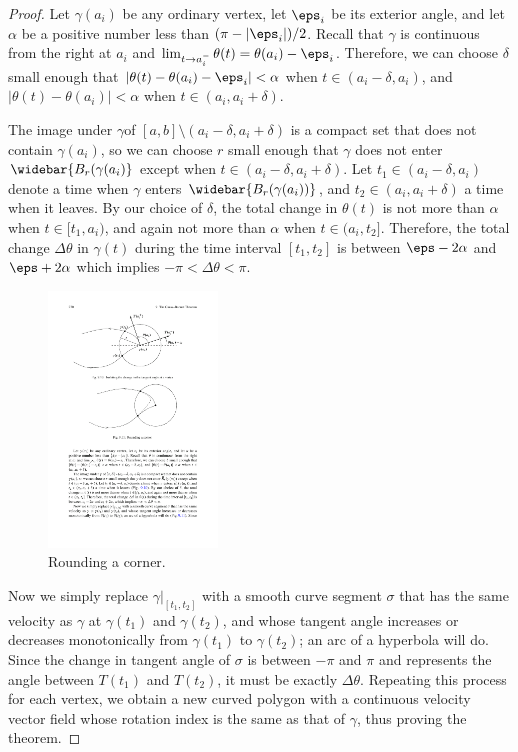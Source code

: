 \begin{proof}
Let $\gamma(a_i)$ be any ordinary vertex, let $\eps_i$ be its exterior angle, and let $\alpha$ be a positive number less than $(\pi-|\eps_i|)/2$. Recall that $\gamma$ 
is continuous from the right at $a_i$ and $\lim_{t\to a_i^{-}}\theta(t)=\theta(a_i)-\eps_i$. Therefore, we can choose $\delta$ small enough that $|\theta(t)-\theta(a_i)-\eps_i|<\alpha$ 
when $t\in(a_i-\delta,a_i)$, and $|\theta(t)-\theta(a_i)|<\alpha$ when $t\in(a_i,a_i+\delta)$.\par
The image under $\gamma$of $[a,b]\setminus(a_i-\delta,a_i+\delta)$ is a compact set that does not contain $\gamma(a_i)$, so we can choose $r$ small enough that $\gamma$ does not enter $\widebar{B_r(\gamma(a_i)}$ except when $t\in(a_i-\delta,a_i+\delta)$. Let $t_1\in(a_i-\delta,a_i)$ denote a time when $\gamma$ enters $\widebar{B_r(\gamma(a_i))}$, and $t_2\in(a_i,a_i+\delta)$ a time when it leaves. By our choice of $\delta$, the total change in $\theta(t)$ is not more than $\alpha$ when $t\in[t_1,a_i)$, and again not more than $\alpha$ when $t\in(a_i,t_2]$. Therefore, the total change $\Delta\theta$ in $\gamma(t)$ during the time interval $[t_1,t_2]$ is between $\eps-2\alpha$ and $\eps+2\alpha$ which implies $-\pi<\Delta\theta<\pi$.
\begin{figure}[H]
\centering
\includegraphics[width=0.4\textwidth]{pictures/rounding-corner}
\caption{Rounding a corner.}
\end{figure}

Now we simply replace $\gamma|_{[t_1,t_2]}$ with a smooth curve segment $\sigma$ that has the same velocity as $\gamma$ at $\gamma(t_1)$ and $\gamma(t_2)$, and whose tangent angle increases or decreases monotonically from $\gamma(t_1)$ to $\gamma(t_2)$; an arc of a hyperbola will do. Since the change in tangent angle of $\sigma$ is between $-\pi$ and $\pi$ and represents the angle between $T(t_1)$ and $T(t_2)$, it must be exactly $\Delta\theta$. Repeating this process for each vertex, we obtain a new curved polygon with a continuous velocity vector field whose rotation index is the same as that of $\gamma$, thus proving the theorem.
\end{proof}
